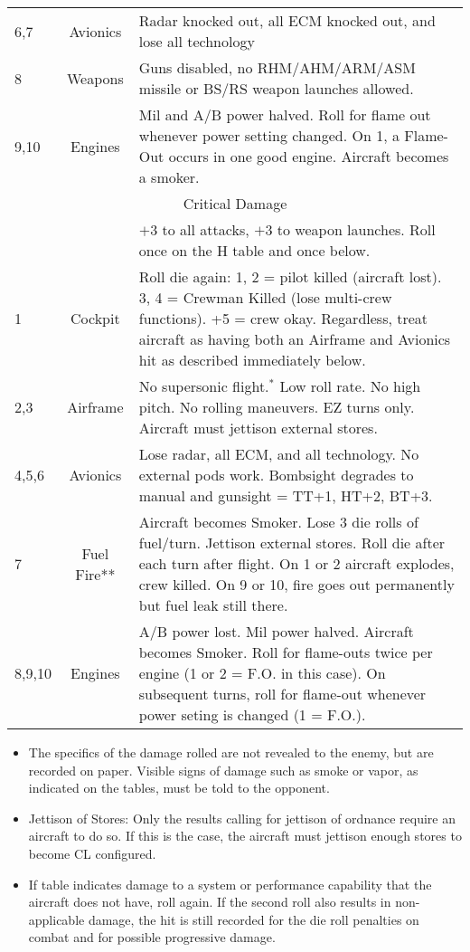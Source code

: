 {\begin{twocolumntablefloat}
\begin{twocolumntable}
{\begin{tabularx}{\linewidth}{lcX}
6,7&Avionics&Radar knocked out, all ECM knocked out, and lose all technology\\
8&Weapons&Guns disabled, no RHM/AHM/ARM/ASM missile or BS/RS weapon launches allowed.\\
9,10&Engines&Mil and A/B power halved. Roll for flame out whenever power setting changed. On 1, a Flame-Out occurs in one good engine. Aircraft becomes a smoker.\\
\midrule
\multicolumn{3}{c}{Critical Damage}\\
\midrule
&&$+3$ to all attacks, $+3$ to weapon launches. Roll once on the H table and once below.\\
1&Cockpit&Roll die again: 1, 2 = pilot killed (aircraft lost). 3, 4 = Crewman Killed (lose multi-crew functions). +5 = crew okay. Regardless, treat aircraft as having both an Airframe and Avionics hit as described immediately below.\\
2,3&Airframe&
No supersonic flight.$^*$ Low roll rate. No high pitch. No rolling maneuvers. EZ turns only. Aircraft must jettison external stores.\\
4,5,6&Avionics&Lose radar, all ECM, and all technology. No external pods work. Bombsight degrades to manual and gunsight = TT+1, HT+2, BT+3.\\
7&Fuel Fire**&Aircraft becomes Smoker. Lose 3 die rolls of fuel/turn. Jettison external stores. Roll die after each turn after flight. On 1 or 2 aircraft explodes, crew killed. On 9 or 10, fire goes out permanently but fuel leak still there.\\
8,9,10&Engines&A/B power lost. Mil power halved. Aircraft becomes Smoker. Roll for flame-outs twice per engine (1 or 2 = F.O. in this case). On subsequent turns, roll for flame-out whenever power seting is changed (1 = F.O.).\\
\bottomrule
\end{tabularx}
\begin{tablenote}{\linewidth}
\begin{itemize}
    \item The specifics of the damage rolled are not revealed to the enemy, but are recorded on paper. Visible signs of damage such as smoke or vapor, as indicated on the tables, must be told to the opponent.
    \item Jettison of Stores: Only the results calling for jettison of ordnance require an aircraft to do so. If this is the case, the aircraft must jettison enough stores to become CL configured. 
    \item If table indicates damage to a system or performance capability that the aircraft does not have, roll again. If the second roll also results in non-applicable damage, the hit is still recorded for the die roll penalties on combat and for possible progressive damage.

\end{itemize}
\end{tablenote}}
\end{twocolumntable}
\end{twocolumntablefloat}}

